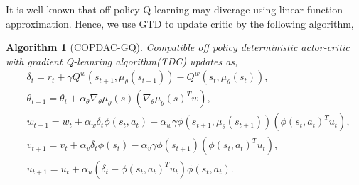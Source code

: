 \documentclass[11pt,a4paper]{article}
\newtheorem{algorithm}{Algorithm}[subsection]
\begin{document}
It is well-known that off-policy Q-learning may diverage using linear function approximation. Hence, we use GTD to update critic by the following algorithm,
\begin{algorithm}[COPDAC-GQ]
Compatible off policy deterministic actor-critic with gradient Q-leanring algorithm(TDC) updates as,
\begin{align}
& \delta_t = r_t + \gamma Q^w(s_{t+1},\mu_{\theta}(s_{t+1}))-Q^w(s_t,\mu_{\theta}(s_t)), \\ 
& \theta_{t+1} = \theta_t + \alpha_{\theta} \nabla_{\theta}\mu_{\theta}(s)(\nabla_{\theta}\mu_{\theta}(s)^Tw), \\
& w_{t+1} = w_t + \alpha_w \delta_t \phi(s_t,a_t)-\alpha_w \gamma \phi(s_{t+1},\mu_{\theta}(s_{t+1}))(\phi(s_t,a_t)^Tu_t), \\ 
& v_{t+1} = v_t + \alpha_v \delta_t \phi(s_t) - \alpha_v \gamma \phi(s_{t+1})(\phi(s_t,a_t)^Tu_t), \\ 
& u_{t+1} = u_t + \alpha_u(\delta_t - \phi(s_t,a_t)^Tu_t)\phi(s_t,a_t). 
\end{align}
\end{algorithm}








\clearpage


\end{document}
